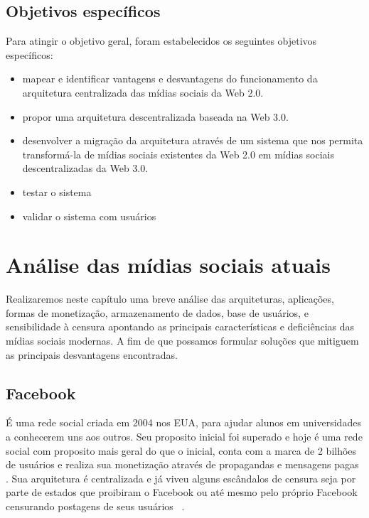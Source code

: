 \section{Objetivos específicos}

Para atingir o objetivo geral, foram estabelecidos os seguintes objetivos específicos:

\begin{itemize}
    \item mapear e identificar vantagens e desvantagens do funcionamento da arquitetura centralizada das mídias sociais da Web 2.0.
    \item propor uma arquitetura descentralizada baseada na Web 3.0.
    \item desenvolver a migração da arquitetura através de um sistema que nos permita transformá-la de mídias sociais existentes da Web 2.0 em mídias sociais descentralizadas da Web 3.0.
    \item testar o sistema
    \item validar o sistema com usuários
\end{itemize}

\chapter{Análise das mídias sociais atuais}

Realizaremos neste capítulo uma breve análise das arquiteturas, aplicações, formas de monetização, armazenamento de dados, base de usuários, e sensibilidade à censura apontando as principais características e deficiências das mídias sociais modernas. 
A fim de que possamos formular soluções que mitiguem as principais desvantagens encontradas.

\section{Facebook}

É uma rede social criada em 2004 nos EUA, para ajudar alunos em universidades a conhecerem uns aos outros.
Seu proposito inicial foi superado e hoje é uma rede social com proposito mais geral do que o inicial,
conta com a marca de 2 bilhões de usuários e realiza sua monetização através de propagandas e mensagens pagas~\cite{Facebook1} \cite{Facebook2}.
Sua arquitetura é centralizada e já viveu alguns escândalos de censura seja por parte de estados que proibiram o Facebook ou até mesmo pelo próprio Facebook censurando postagens de seus usuários~\cite{Facebook4} \cite{Facebook5}.

